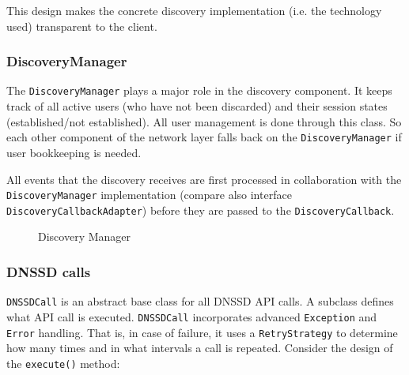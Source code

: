 This design makes the concrete discovery implementation (i.e. the technology used) transparent to the client.


\subsubsection{DiscoveryManager}
The  \texttt{DiscoveryManager} plays a major role in the discovery component. It keeps track of all active users (who have not been discarded) and their session states (established/not established). All user management is done through this class. So each other component of the network layer falls back on the  \texttt{DiscoveryManager} if user bookkeeping is needed.

All events that the discovery receives are first processed in collaboration with the \texttt{DiscoveryManager} implementation (compare also interface \texttt{DiscoveryCallbackAdapter}) before they are passed to the  \texttt{DiscoveryCallback}.

\begin{figure}[H]
 \centering
 \caption{Discovery Manager}
 \label{fig:network.discovery.manager}
\end{figure}


\subsubsection{DNSSD calls}
\label{chapter:discovery.dnssdcall.introduction}
\texttt{DNSSDCall} is an abstract base class for all DNSSD API calls. A subclass defines what API call is executed. \texttt{DNSSDCall} incorporates advanced \texttt{Exception} and \texttt{Error} handling. That is, in case of failure, it uses a \texttt{RetryStrategy} to determine how many times and in what intervals a call is repeated. Consider the design of the \texttt{execute()} method:

